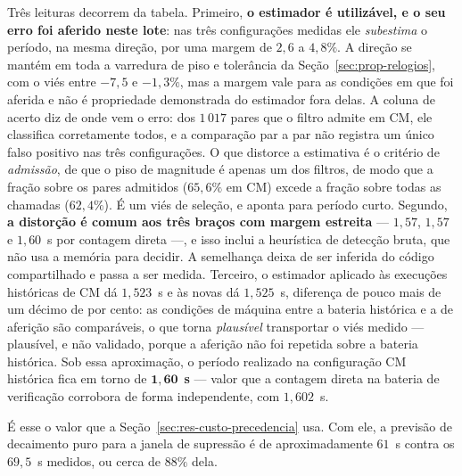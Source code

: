 Três leituras decorrem da tabela. Primeiro, \textbf{o estimador é utilizável, e o seu
erro foi aferido neste lote}: nas três configurações medidas ele \emph{subestima} o
período, na mesma direção, por uma margem de $2{,}6$ a $4{,}8\%$. A direção se mantém em
toda a varredura de piso e tolerância da Seção~\ref{sec:prop-relogios}, com o viés
entre $-7{,}5$ e $-1{,}3\%$, mas a margem vale para as condições em que foi aferida e
não é propriedade demonstrada do estimador fora delas. A coluna de acerto diz de onde
vem o erro: dos $1\,017$ pares que o filtro admite em CM, ele classifica corretamente
todos, e a comparação par a par não registra um único falso positivo nas três
configurações. O que distorce a estimativa é o critério de \emph{admissão}, de que o
piso de magnitude é apenas um dos filtros, de modo que a fração sobre os pares
admitidos ($65{,}6\%$ em CM) excede a fração sobre todas as chamadas ($62{,}4\%$).
É um viés de seleção, e aponta para período curto. Segundo, \textbf{a distorção é comum aos três braços com margem estreita} ---
$1{,}57$, $1{,}57$ e $1{,}60$~s por contagem direta ---, e isso inclui a heurística de
detecção bruta, que não usa a memória para decidir. A semelhança deixa de ser inferida
do código compartilhado e passa a ser medida. Terceiro, o estimador aplicado às
execuções históricas de CM dá $1{,}523$~s e às novas dá $1{,}525$~s, diferença de pouco
mais de um décimo de por cento: as condições de máquina entre a bateria histórica e a de aferição são
comparáveis, o que torna \emph{plausível} transportar o viés medido --- plausível, e não
validado, porque a aferição não foi repetida sobre a bateria histórica. Sob essa
aproximação, o período realizado na configuração CM histórica fica em torno de
$\mathbf{1{,}60}$~\textbf{s} --- valor que a contagem direta na bateria de
verificação corrobora de forma independente, com $1{,}602$~s.


É esse o valor que a Seção~\ref{sec:res-custo-precedencia} usa. Com ele, a previsão de
decaimento puro para a janela de supressão é de aproximadamente $61$~s contra os
$69{,}5$~s medidos, ou cerca de $88\%$ dela.

